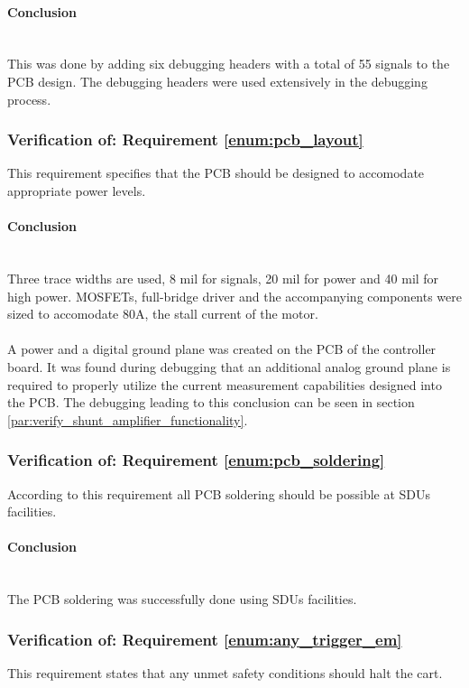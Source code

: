\paragraph{Conclusion}~\\
This was done by adding six debugging headers with a total of 55 signals to the PCB design.
The debugging headers were used extensively in the debugging process.

\subsubsection{Verification of: Requirement \ref{enum:pcb_layout}} %
\label{ssub:requirement_enum:pcb_layout}
This requirement specifies that the PCB should be designed to accomodate appropriate power levels.
\paragraph{Conclusion}~\\
Three trace widths are used, 8 mil for signals, 20 mil for power and 40 mil for high power.
MOSFETs, full-bridge driver and the accompanying components were sized to accomodate 80A, the stall current of the motor.
\\~\\
A power and a digital ground plane was created on the PCB of the controller board.
It was found during debugging that an additional analog ground plane is required to properly utilize the current measurement capabilities designed into the PCB.
The debugging leading to this conclusion can be seen in section \ref{par:verify_shunt_amplifier_functionality}.

\subsubsection{Verification of: Requirement \ref{enum:pcb_soldering}} %
\label{ssub:requirement_enum:pcb_soldering}
According to this requirement all PCB soldering should be possible at SDUs facilities.
\paragraph{Conclusion}~\\
The PCB soldering was successfully done using SDUs facilities.

\subsubsection{Verification of: Requirement \ref{enum:any_trigger_em}} %
\label{ssub:requirement_enum:any_trigger_em}
This requirement states that any unmet safety conditions should halt the cart.

